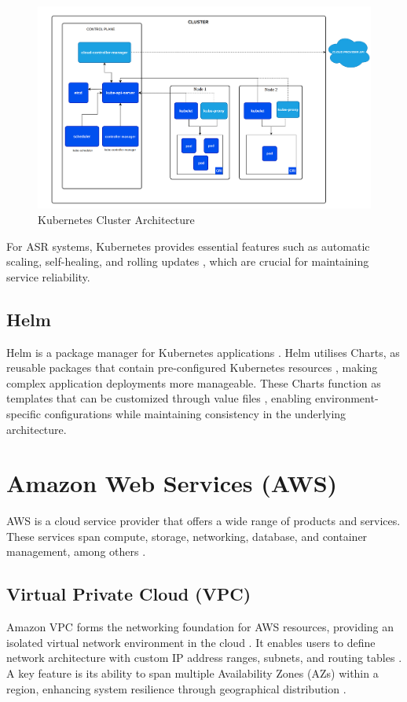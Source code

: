 \begin{figure}[H]
    \centering
    \includegraphics[width=\textwidth]{figures/kubernetes_architecture.png}
    \caption{Kubernetes Cluster Architecture \cite{k8s_cluster}}
    \label{fig:kubernetes_architecture}
\end{figure}

For ASR systems, Kubernetes provides essential features such as automatic scaling, self-healing, and rolling updates \cite{k8s_features}, which are crucial for maintaining service reliability.

\subsection{Helm}
Helm is a package manager for Kubernetes applications \cite{helm_definition}. Helm utilises Charts, as reusable packages that contain pre-configured Kubernetes resources \cite{helm_charts}, making complex application deployments more manageable. These Charts function as templates that can be customized through value files \cite{helm_definition}, enabling environment-specific configurations while maintaining consistency in the underlying architecture.

\section{Amazon Web Services (AWS)}
AWS is a cloud service provider that offers a wide range of products and services. These services span compute, storage, networking, database, and container management, among others \cite{aws_definition}.

\subsection{Virtual Private Cloud (VPC)}
Amazon VPC forms the networking foundation for AWS resources, providing an isolated virtual network environment in the cloud \cite{vpc}. It enables users to define network architecture with custom IP address ranges, subnets, and routing tables \cite{vpc}. A key feature is its ability to span multiple Availability Zones (AZs) within a region, enhancing system resilience through geographical distribution \cite{vpc_az}.

